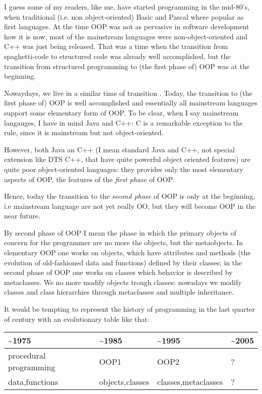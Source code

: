 \documentclass[10pt,english]{article}
\newlength{\locallinewidth}
\begin{document}
I guess some of my readers, like me, have started programming in the mid-80's,
when traditional (i.e. non object-oriented) Basic and Pascal where popular as 
first languages. At the time OOP was not as pervasive in software development 
how it is now, most of the mainstream languages were non-object-oriented and 
C++ was just being released. That was a time when the transition from 
spaghetti-code to structured code was already well accomplished, but 
the transition from structured programming to (the first phase of) 
OOP was at the beginning.

Nowaydays, we live in a similar time of transition . Today, the transition 
to (the first phase of) OOP is well accomplished and essentially all 
mainstream
languages support some elementary form of OOP. To be clear, when I say
mainstream langauges, I have in mind Java and C++: C is a remarkable 
exception to the  rule, since it is mainstream but not object-oriented.

However, both Java an C++ (I mean standard Java and C++, not special
extension like DTS C++, that have quite powerful object oriented features)
are quite poor object-oriented languages: they provides only the most 
elementary aspects of OOP, the features of the \emph{first phase} of OOP.

Hence, today the transition to the \emph{second phase} of OOP is only at the 
beginning, i.e mainstream language are not yet really OO, but they will
become OOP in the near future.

By second phase of OOP I mean the phase in which the primary
objects of concern for the programmer are no more the objects, but the
metaobjects. In elementary OOP one works on objects, which have attributes
and methods (the evolution of old-fashioned data and functions)  defined
by their classes; in the second phase of OOP one works on classes 
which behavior is described by metaclasses. We no more modify objects 
trough classes: nowadays we modify classes and class hierarchies 
through metaclasses and multiple inheritance.

It would be tempting to represent the history of programming in the last
quarter of century with an evolutionary table like that:

\begin{longtable}[c]{|p{0.30\locallinewidth}|p{0.25\locallinewidth}|p{0.27\locallinewidth}|p{0.10\locallinewidth}|}
\hline
\textbf{
{\textasciitilde}1975
} & \textbf{
{\textasciitilde}1985
} & \textbf{
{\textasciitilde}1995
} & \textbf{
{\textasciitilde}2005
} \\ \hline
\endhead

procedural programming
 & 
OOP1
 & 
OOP2
 & 
?
 \\ \hline

data,functions
 & 
objects,classes
 & 
classes,metaclasses
 & 
?
 \\ \hline
\end{longtable}
\end{document}

